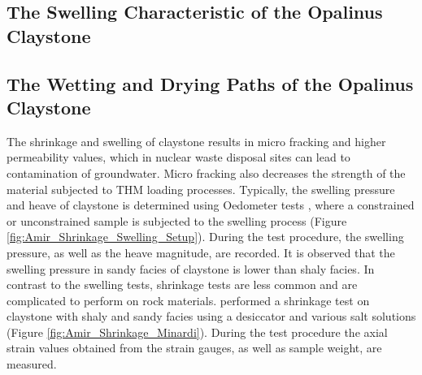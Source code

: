 \subsection{The Swelling Characteristic of the Opalinus Claystone}


\subsection{The Wetting and Drying Paths of the Opalinus Claystone}
\label{sec:Shrinkage_Swelling_Exp}

The shrinkage and swelling of claystone results in micro fracking and higher permeability values, which in nuclear waste disposal sites can lead to contamination of groundwater. Micro fracking also decreases the strength of the material subjected to THM  loading processes. Typically, the swelling pressure and heave of claystone is determined using Oedometer tests \cite{Peronetal2009}, where a constrained or unconstrained sample is subjected to the swelling process (Figure \ref{fig:Amir_Shrinkage_Swelling_Setup}). During the test procedure, the swelling pressure, as well as the heave magnitude, are recorded. It is observed that the swelling pressure in sandy facies of claystone is lower than shaly facies. In contrast to the swelling tests, shrinkage tests are less common and are complicated to perform on rock materials. \cite{Minardietal2016} performed a shrinkage test on claystone with shaly and sandy facies using a desiccator and various salt solutions (Figure  \ref{fig:Amir_Shrinkage_Minardi}). During the test procedure the axial strain values obtained from the strain gauges, as well as sample weight, are measured.

